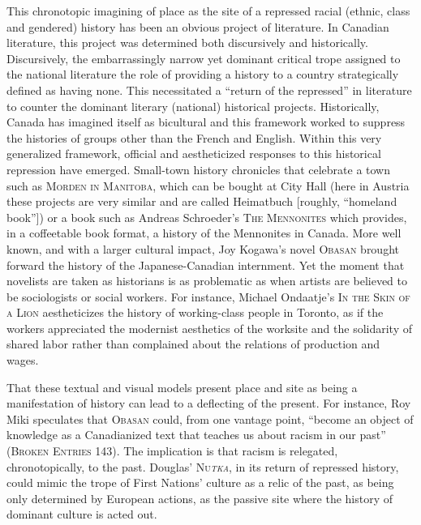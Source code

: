 \documentclass[
]{memoir}
\begin{document}
This chronotopic imagining of place as the site of a repressed racial
(ethnic, class and gendered) history has been an obvious project of
literature. In Canadian literature, this project was determined both
discursively and historically. Discursively, the embarrassingly narrow
yet dominant critical trope assigned to the national literature the role
of providing a history to a country strategically defined as having
none. This necessitated a ``return of the repressed'' in literature to
counter the dominant literary (national) historical projects.
Historically, Canada has imagined itself as bicultural and this
framework worked to suppress the histories of groups other than the
French and English. Within this very generalized framework, official and
aestheticized responses to this historical repression have emerged.
Small-town history chronicles that celebrate a town such as
\textsc{Morden in Manitoba}, which can be bought at City Hall (here in
Austria these projects are very similar and are called Heimatbuch
{[}roughly, ``homeland book''{]}) or a book such as Andreas Schroeder's
\textsc{The Mennonites} which provides, in a coffeetable book format, a
history of the Mennonites in Canada. More well known, and with a larger
cultural impact, Joy Kogawa's novel \textsc{Obasan} brought forward the
history of the Japanese-Canadian internment. Yet the moment that
novelists are taken as historians is as problematic as when artists are
believed to be sociologists or social workers. For instance, Michael
Ondaatje's \textsc{In the Skin of a Lion} aestheticizes the history of
working-class people in Toronto, as if the workers appreciated the
modernist aesthetics of the worksite and the solidarity of shared labor
rather than complained about the relations of production and wages.

That these textual and visual models present place and site as being a
manifestation of history can lead to a deflecting of the present. For
instance, Roy Miki speculates that \textsc{Obasan} could, from one
vantage point, ``become an object of knowledge as a Canadianized text
that teaches us about racism in our past'' (\textsc{Broken Entries}
143). The implication is that racism is relegated, chronotopically, to
the past. Douglas' \textsc{Nu\emph{tka}}, in its return of repressed
history, could mimic the trope of First Nations' culture as a relic of
the past, as being only determined by European actions, as the passive
site where the history of dominant culture is acted out.
\end{document}
